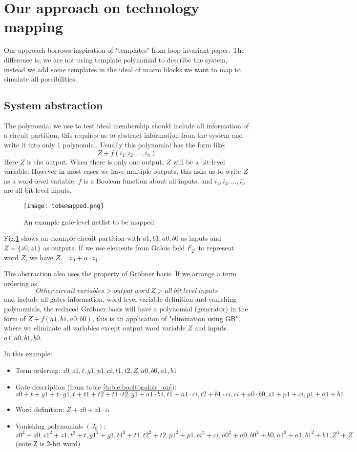 \documentclass[conference,10pt]{IEEEtran}
\begin{document}
\section{Our approach on technology mapping}
Our approach borrows inspiration of "templates" from loop invariant paper. The difference is,
we are not using template polynomial to describe the system, instead we add some templates in the ideal
of macro blocks we want to map to simulate all possibilities.
\subsection{System abstraction}
The polynomial we use to test ideal membership should include all information of a circuit partition,
this requires us to abstract information from the system and write it into only 1 polynomial.
Usually this polynomial has the form like:
$$Z + f(i_1,i_2,\dots,i_n)$$
Here $Z$ is the output. When there is only one output, $Z$ will be a bit-level variable. However in most
cases we have multiple outputs, this asks us to write $Z$ as a word-level variable. $f$ is a Boolean
function about all inputs, and $i_1,i_2,\dots,i_n$ are all bit-level inputs.

\begin{figure}[hbt]
	\begin{center}
	\texttt{[image: tobemapped.png]}
	\end{center}
	\caption{An example gate-level netlist to be mapped}
	\label{fig:tobemapped}
\end{figure}

Fig.\ref{fig:tobemapped} shows an example circuit partition with $a1,b1,a0,b0$ as inputs and
$Z = \{z0,z1\}$ as outputs. If we use elements from Galois field $F_{2^2}$ to represent word $Z$,
we have $Z = z_0 + \alpha\cdot z_1$.

The abstraction also uses the property of Gr\"obner basis. If we arrange a term ordering as
$$Other\ circuit\ variables > output\ word\ Z > all\ bit\ level\ inputs$$
and include all gates information, word level variable definition and vanishing polynomials,
the reduced Gr\"obner basis will have a polynomial (generator) in the form of $Z + f(a1,b1,a0,b0)$,
this is an application of "elimination using GB", where we eliminate all variables except output
word variable $Z$ and inputs $a1,a0,b1,b0$.

In this example:

\begin{itemize}
\item Term ordering: $z0,z1,t,g1,p1,ci,t1,t2,Z,a0,b0,a1,b1$
\item Gate description (from table \ref{table:booltogalois_op}): $z0+t+g1+t\cdot g1, t+t1+t2+t1\cdot t2, g1+a1\cdot b1,
			t1+a1\cdot ci, t2+b1\cdot ci, ci+a0\cdot b0, z1+p1+ci, p1+a1+b1$
\item Word definition: $Z+z0+z1\cdot \alpha$
\item Vanishing polynomials $(J_0)$: $z0^2+z0, z1^2+z1, t^2+t, g1^2+g1, t1^2+t1, t2^2+t2, p1^2+p1, ci^2+ci,
			a0^2+a0, b0^2+b0, a1^2+a1, b1^2+b1, Z^4+Z$(note Z is 2-bit word)
\end{itemize}
\end{document}

